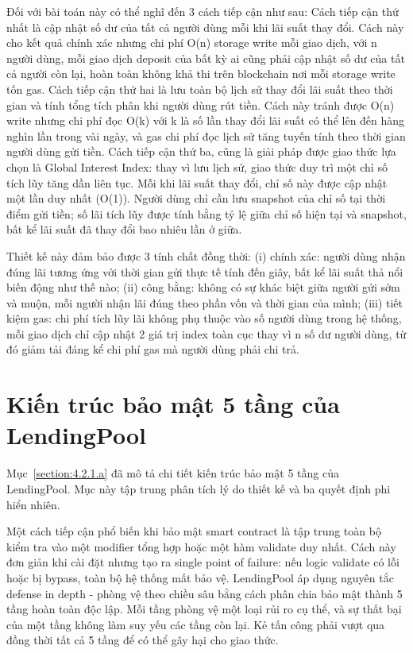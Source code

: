 \documentclass[../DoAn.tex]{subfiles}
\begin{document}
Đối với bài toán này có thể nghĩ đến 3 cách tiếp cận như sau: Cách tiếp cận thứ nhất là cập nhật số dư của tất cả người dùng mỗi khi lãi suất thay đổi. Cách này cho kết quả chính xác nhưng chi phí O(n) storage write mỗi giao dịch, với n người dùng, mỗi giao dịch deposit của bất kỳ ai cũng phải cập nhật số dư của tất cả người còn lại, hoàn toàn không khả thi trên blockchain nơi mỗi storage write tốn gas. Cách tiếp cận thứ hai là lưu toàn bộ lịch sử thay đổi lãi suất theo thời gian và tính tổng tích phân khi người dùng rút tiền. Cách này tránh được O(n) write nhưng chi phí đọc O(k) với k là số lần thay đổi lãi suất có thể lên đến hàng nghìn lần trong vài ngày, và gas chi phí đọc lịch sử tăng tuyến tính theo thời gian người dùng gửi tiền. Cách tiếp cận thứ ba, cũng là giải pháp được giao thức lựa chọn là Global Interest Index: thay vì lưu lịch sử, giao thức duy trì một chỉ số tích lũy tăng dần liên tục. Mỗi khi lãi suất thay đổi, chỉ số này được cập nhật một lần duy nhất (O(1)). Người dùng chỉ cần lưu snapshot của chỉ số tại thời điểm gửi tiền; số lãi tích lũy được tính bằng tỷ lệ giữa chỉ số hiện tại và snapshot, bất kể lãi suất đã thay đổi bao nhiêu lần ở giữa.

Thiết kế này đảm bảo được 3 tính chất đồng thời: (i) chính xác: người dùng nhận đúng lãi tương ứng với thời gian gửi thực tế tính đến giây, bất kể lãi suất thả nổi biến động như thế nào; (ii) công bằng: không có sự khác biệt giữa người gửi sớm và muộn, mỗi người nhận lãi đúng theo phần vốn và thời gian của mình; (iii) tiết kiệm gas: chi phí tích lũy lãi không phụ thuộc vào số người dùng trong hệ thống, mỗi giao dịch chỉ cập nhật 2 giá trị index toàn cục thay vì n số dư người dùng, từ đó giảm tải đáng kể chi phí gas mà người dùng phải chi trả.

\section{Kiến trúc bảo mật 5 tầng của LendingPool}
\label{section:5.2}


Mục~\ref{section:4.2.1.a} đã mô tả chi tiết kiến trúc bảo mật 5 tầng của LendingPool. Mục này tập trung phân tích lý do thiết kế và ba quyết định phi hiển nhiên.

Một cách tiếp cận phổ biến khi bảo mật smart contract là tập trung toàn bộ kiểm tra vào một modifier tổng hợp hoặc một hàm validate duy nhất. Cách này đơn giản khi cài đặt nhưng tạo ra single point of failure: nếu logic validate có lỗi hoặc bị bypass, toàn bộ hệ thống mất bảo vệ. LendingPool áp dụng nguyên tắc defense in depth - phòng vệ theo chiều sâu bằng cách phân chia bảo mật thành 5 tầng hoàn toàn độc lập. Mỗi tầng phòng vệ một loại rủi ro cụ thể, và sự thất bại của một tầng không làm suy yếu các tầng còn lại. Kẻ tấn công phải vượt qua đồng thời tất cả 5 tầng để có thể gây hại cho giao thức.
\end{document}
